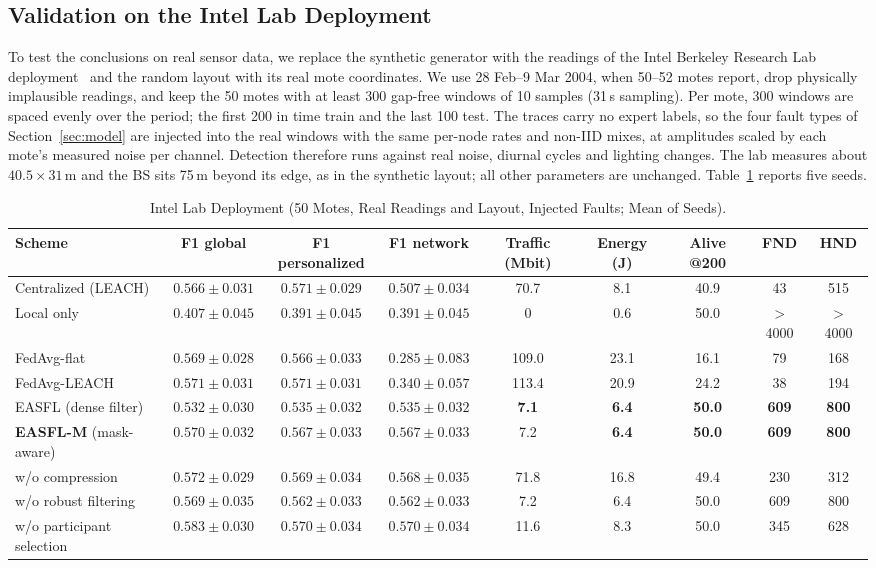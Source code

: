 \documentclass[journal]{IEEEtran}
\newcommand{\revtab}{\ifdefined\cleanversion\else\color{blue}\fi}
\begin{document}
\subsection{Validation on the Intel Lab Deployment}\label{sec:intel}
To test the conclusions on real sensor data, we replace the synthetic generator with the readings of the Intel Berkeley Research Lab deployment~\cite{intellab2004} and the random layout with its real mote coordinates. We use 28 Feb--9 Mar 2004, when 50--52 motes report, drop physically implausible readings, and keep the 50 motes with at least 300 gap-free windows of 10 samples (31\,s sampling). Per mote, 300 windows are spaced evenly over the period; the first 200 in time train and the last 100 test. The traces carry no expert labels, so the four fault types of Section~\ref{sec:model} are injected into the real windows with the same per-node rates and non-IID mixes, at amplitudes scaled by each mote's measured noise per channel. Detection therefore runs against real noise, diurnal cycles and lighting changes. The lab measures about $40.5\times31$\,m and the BS sits 75\,m beyond its edge, as in the synthetic layout; all other parameters are unchanged. Table~\ref{tab:intel} reports five seeds.

\begin{table}[t]
\caption{Intel Lab Deployment (50 Motes, Real Readings and Layout, Injected Faults; Mean of  Seeds). }\label{tab:intel}
\centering\revtab\footnotesize
\begin{tabular}{@{}lcccccccc@{}}
\toprule
Scheme & F1 global & F1 personalized & F1 network & Traffic (Mbit) & Energy (J) & Alive @200 & FND & HND\\
\midrule
Centralized (LEACH) & $0.566\pm0.031$ & $0.571\pm0.029$ & $0.507\pm0.034$ & 70.7 & 8.1 & 40.9 & 43 & 515\\
Local only & $0.407\pm0.045$ & $0.391\pm0.045$ & $0.391\pm0.045$ & 0 & 0.6 & 50.0 & $>$4000 & $>$4000\\
FedAvg-flat & $0.569\pm0.028$ & $0.566\pm0.033$ & $0.285\pm0.083$ & 109.0 & 23.1 & 16.1 & 79 & 168\\
FedAvg-LEACH & $0.571\pm0.031$ & $0.571\pm0.031$ & $0.340\pm0.057$ & 113.4 & 20.9 & 24.2 & 38 & 194\\
EASFL (dense filter) & $0.532\pm0.030$ & $0.535\pm0.032$ & $0.535\pm0.032$ & \textbf{7.1} & \textbf{6.4} & \textbf{50.0} & \textbf{609} & \textbf{800}\\
\textbf{EASFL-M} (mask-aware) & $\mathbf{0.570\pm0.032}$ & $\mathbf{0.567\pm0.033}$ & $\mathbf{0.567\pm0.033}$ & 7.2 & \textbf{6.4} & \textbf{50.0} & \textbf{609} & \textbf{800}\\
\quad w/o compression & $0.572\pm0.029$ & $0.569\pm0.034$ & $0.568\pm0.035$ & 71.8 & 16.8 & 49.4 & 230 & 312\\
\quad w/o robust filtering & $0.569\pm0.035$ & $0.562\pm0.033$ & $0.562\pm0.033$ & 7.2 & 6.4 & 50.0 & 609 & 800\\
\quad w/o participant selection & $0.583\pm0.030$ & $0.570\pm0.034$ & $0.570\pm0.034$ & 11.6 & 8.3 & 50.0 & 345 & 628\\
\bottomrule
\end{tabular}
\end{table}
\end{document}
